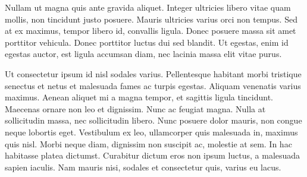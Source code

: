 Nullam ut magna quis ante gravida aliquet. Integer ultricies libero vitae quam mollis, non tincidunt justo posuere. Mauris ultricies varius orci non tempus. Sed at ex maximus, tempor libero id, convallis ligula. Donec posuere massa sit amet porttitor vehicula. Donec porttitor luctus dui sed blandit. Ut egestas, enim id egestas auctor, est ligula accumsan diam, nec lacinia massa elit vitae purus.

Ut consectetur ipsum id nisl sodales varius. Pellentesque habitant morbi tristique senectus et netus et malesuada fames ac turpis egestas. Aliquam venenatis varius maximus. Aenean aliquet mi a magna tempor, et sagittis ligula tincidunt. Maecenas ornare non leo et dignissim. Nunc ac feugiat magna. Nulla at sollicitudin massa, nec sollicitudin libero. Nunc posuere dolor mauris, non congue neque lobortis eget. Vestibulum ex leo, ullamcorper quis malesuada in, maximus quis nisl. Morbi neque diam, dignissim non suscipit ac, molestie at sem. In hac habitasse platea dictumst. Curabitur dictum eros non ipsum luctus, a malesuada sapien iaculis. Nam mauris nisi, sodales et consectetur quis, varius eu lacus.
